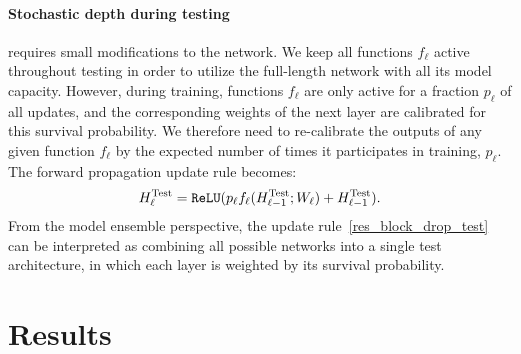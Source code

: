 \documentclass[runningheads]{llncs}
\begin{document}
\paragraph{\textbf{Stochastic depth during testing}} requires small modifications to the network. We keep all functions $f_\ell$ active throughout testing in order to utilize the full-length network with all its model capacity. However, during training, functions $f_\ell$ are only active for a fraction $p_\ell$ of all updates, and the corresponding weights of the next layer are calibrated for this survival probability. We therefore need to re-calibrate the outputs of any given function $f_\ell$ by the expected number of times it participates in training, $p_\ell$. The forward propagation update rule becomes:
\begin{equation}
\label{res_block_drop_test}
 H_\ell^\text{Test} = {\tt ReLU} (p_\ell f_\ell(H_{\ell-1}^\text{Test}; W_\ell) +  H_{\ell-1}^\text{Test}).
\end{equation}
From the model ensemble perspective, the update rule~\eqref{res_block_drop_test} can be interpreted as combining all possible networks into a single test architecture, in which each layer is weighted by its survival probability.
 


\section{Results}

\label{sec_results}
\end{document}
